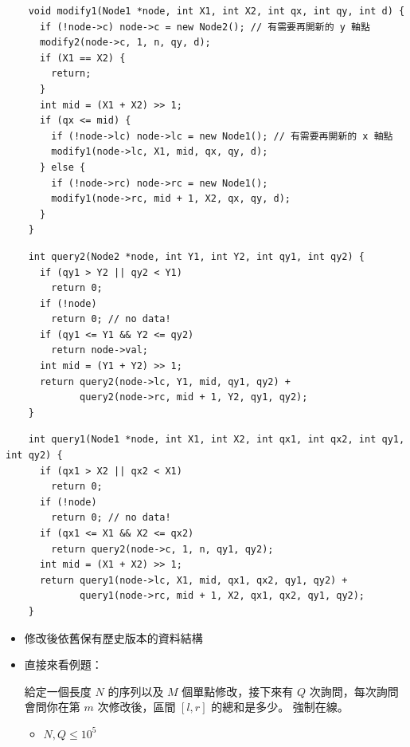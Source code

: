 \documentclass[standalone]{beamer}
\begin{document}
\begin{frame}[fragile]{}
  \begin{verbatim}
    void modify1(Node1 *node, int X1, int X2, int qx, int qy, int d) {
      if (!node->c) node->c = new Node2(); // 有需要再開新的 y 軸點
      modify2(node->c, 1, n, qy, d);
      if (X1 == X2) {
        return;
      }
      int mid = (X1 + X2) >> 1;
      if (qx <= mid) {
        if (!node->lc) node->lc = new Node1(); // 有需要再開新的 x 軸點
        modify1(node->lc, X1, mid, qx, qy, d);
      } else {
        if (!node->rc) node->rc = new Node1();
        modify1(node->rc, mid + 1, X2, qx, qy, d);
      }
    }
  \end{verbatim}
\end{frame}

\begin{frame}[fragile]{}
  \begin{verbatim}
    int query2(Node2 *node, int Y1, int Y2, int qy1, int qy2) {
      if (qy1 > Y2 || qy2 < Y1)
        return 0;
      if (!node)
        return 0; // no data!
      if (qy1 <= Y1 && Y2 <= qy2)
        return node->val;
      int mid = (Y1 + Y2) >> 1;
      return query2(node->lc, Y1, mid, qy1, qy2) +
             query2(node->rc, mid + 1, Y2, qy1, qy2);
    }
  \end{verbatim}
\end{frame}

\begin{frame}[fragile]{}
  \begin{verbatim}
    int query1(Node1 *node, int X1, int X2, int qx1, int qx2, int qy1, int qy2) {
      if (qx1 > X2 || qx2 < X1)
        return 0;
      if (!node)
        return 0; // no data!
      if (qx1 <= X1 && X2 <= qx2)
        return query2(node->c, 1, n, qy1, qy2);
      int mid = (X1 + X2) >> 1;
      return query1(node->lc, X1, mid, qx1, qx2, qy1, qy2) +
             query1(node->rc, mid + 1, X2, qx1, qx2, qy1, qy2);
    }
  \end{verbatim}
\end{frame}

\begin{frame}[fragile]{}
  \begin{itemize}
    \item 修改後依舊保有歷史版本的資料結構
    \item 直接來看例題：
    \begin{problem}[歷史版本和]
      給定一個長度 $N$ 的序列以及 $M$ 個單點修改，接下來有 $Q$ 次詢問，每次詢問會問你在第 $m$ 次修改後，區間 $[l, r]$ 的總和是多少。
      強制在線。
      
      \begin{itemize}
          \item
              $N, Q \leq 10^5$
      \end{itemize}
    \end{problem}
  \end{itemize}
\end{frame}
\end{document}
